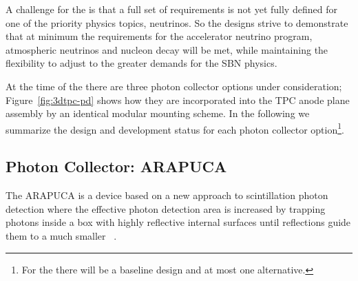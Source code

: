 A challenge for the  is that a full set of requirements is not yet fully defined for one of the priority physics topics,  neutrinos. So the designs strive to demonstrate that at minimum the requirements for the accelerator neutrino program, atmospheric neutrinos and nucleon decay will be met, while maintaining the flexibility to adjust to the greater demands for the SBN physics.    
 

At the time of the  there are three photon collector options under consideration; Figure~\ref{fig:3dtpc-pd} shows how they are incorporated into the TPC anode plane assembly by an identical modular mounting scheme. In the following we summarize the design and development status for each photon collector option\footnote{For the  there will be a baseline design and at most one alternative.}.



\subsection{Photon Collector: ARAPUCA}
\label{ssec:fdsp-pd-pc-arapuca}

The ARAPUCA is a device based on a new approach to \lar scintillation photon detection where the effective photon detection area is increased by trapping photons inside a box with highly reflective internal surfaces until reflections guide them to a much smaller ~\cite{arapuca_jinst}. 

